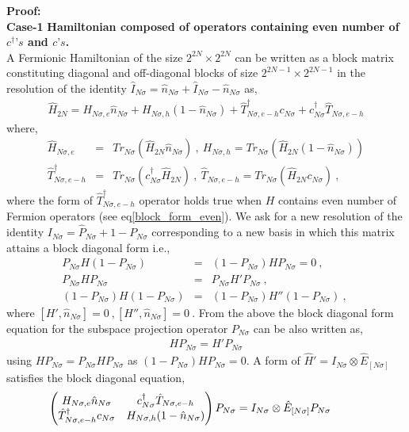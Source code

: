 \documentclass[12pt,a4paper]{article}
\begin{document}
\textbf{Proof:}\\
\textbf{Case-1} \textbf{Hamiltonian composed of operators containing even number of $c^{\dagger}\text{'}s$ and $c\text{'}s$.}\\
A Fermionic Hamiltonian  of the size $2^{2N}\times 2^{2N}$ can be written as a block matrix constituting diagonal and off-diagonal blocks of size $2^{2N-1}\times 2^{2N-1}$ in the resolution of the identity $\hat{I}_{N\sigma}=\hat{n}_{N\sigma}+\hat{I}_{N\sigma}-\hat{n}_{N\sigma}$ as,
\begin{eqnarray}
\hat{H}_{2N}=H_{N\sigma,e}\hat{n}_{N\sigma}+H_{N\sigma,h}(1-\hat{n}_{N\sigma})+\hat{T}^{\dagger}_{N\sigma,e-h}c_{N\sigma}+c^{\dagger}_{N\sigma}\hat{T}_{N\sigma,e-h}\nonumber
\end{eqnarray} 
where,
\begin{eqnarray}
\hat{H}_{N\sigma,e} &=& Tr_{N\sigma}(\hat{H}_{2N}\hat{n}_{N\sigma})~,~ H_{N\sigma,h} = Tr_{N\sigma}(\hat{H}_{2N}(1-\hat{n}_{N\sigma}))\nonumber\\
\hat{T}^{\dagger}_{N\sigma,e-h} &=& Tr_{N\sigma}(c^{\dagger}_{N\sigma}\hat{H}_{2N})~,~\hat{T}_{N\sigma,e-h} = Tr_{N\sigma}(\hat{H}_{2N}c_{N\sigma})~,\nonumber\label{block_matrix}
\end{eqnarray}
where the form of $\hat{T}^{\dagger}_{N\sigma,e-h}$ operator holds true when $H$ contains even number of Fermion operators (see eq\eqref{block_form_even}).
We ask for a new resolution of the identity $I_{N\sigma}=\hat{P}_{N\sigma}+1-P_{N\sigma}$ corresponding to a new basis in which this matrix attains a block diagonal form i.e.,
\begin{eqnarray}
P_{N\sigma}H(1-P_{N\sigma})&=&(1-P_{N\sigma})HP_{N\sigma}=0~,~\nonumber\\
P_{N\sigma}HP_{N\sigma} &=& P_{N\sigma}H'P_{N\sigma}~,~\nonumber\\
(1-P_{N\sigma})H(1-P_{N\sigma}) &=& (1-P_{N\sigma})H''(1-P_{N\sigma})~,~\nonumber
\end{eqnarray}
where $[H',\hat{n}_{N\sigma}]=0~,[H'',\hat{n}_{N\sigma}]=0~$. From the above the block diagonal form equation for the subspace projection operator $P_{N\sigma}$ can be also written as,
\begin{eqnarray}
HP_{N\sigma} = H'P_{N\sigma}
\end{eqnarray}
using $HP_{N\sigma} = P_{N\sigma}HP_{N\sigma}$ as $(1-P_{N\sigma})HP_{N\sigma}=0$.
 A form of $\hat{H}'=I_{N\sigma}\otimes\hat{E}_{[N\sigma]} $ satisfies the block diagonal equation,
\begin{eqnarray}
\hspace*{-1cm}
\begin{pmatrix}
			H_{N\sigma,e}\hat{n}_{N\sigma}								 & c^{\dagger}_{N\sigma}\hat{T}_{N\sigma,e-h}\\
				\hat{T}^{\dagger}_{N\sigma,e-h}c_{N\sigma}						& H_{N\sigma,h}(1-\hat{n}_{N\sigma})
											\end{pmatrix}P_{N\sigma}= I_{N\sigma}\otimes\hat{E}_{[N\sigma]}P_{N\sigma}\label{block_diagonal_eqn}
\end{eqnarray}
\end{document}

